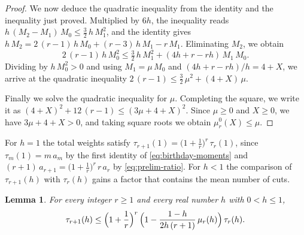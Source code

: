 \documentclass{amsart}
\newtheorem{lemma}[theorem]{Lemma}
\theoremstyle{definition}
\theoremstyle{remark}
\numberwithin{equation}{section}
\begin{document}
\begin{proof}
We now deduce the quadratic inequality from the identity and the inequality just proved. Multiplied by $6h$, the inequality reads $h\,(M_2-M_1)\,M_0\le\frac32\,h\,M_1^2$, and the identity gives $h\,M_2=2\,(r-1)\,h\,M_0+(r-3)\,h\,M_1-r\,M_1$. Eliminating $M_2$, we obtain
\[
2\,(r-1)\,h\,M_0^2\le\tfrac32\,h\,M_1^2+(4h+r-rh)\,M_1\,M_0.
\]
Dividing by $h\,M_0^2>0$ and using $M_1=\mu\,M_0$ and $(4h+r-rh)/h=4+X$, we arrive at the quadratic inequality $2\,(r-1)\le\frac32\,\mu^2+(4+X)\,\mu$.

Finally we solve the quadratic inequality for $\mu$. Completing the square, we write it as $(4+X)^2+12\,(r-1)\le(3\mu+4+X)^2$. Since $\mu\ge 0$ and $X\ge 0$, we have $3\mu+4+X>0$, and taking square roots we obtain $\mu^0_r(X)\le\mu$.
\end{proof}

For $h=1$ the total weights satisfy $\tau_{r+1}(1)=\bigl(1+\frac1r\bigr)^{r}\,\tau_r(1)$, since $\tau_m(1)=m\,a_m$ by the first identity of \eqref{eq:birthday-moments} and $(r+1)\,a_{r+1}=\bigl(1+\frac1r\bigr)^{r}\,r\,a_r$ by \eqref{eq:prelim-ratio}. For $h<1$ the comparison of $\tau_{r+1}(h)$ with $\tau_r(h)$ gains a factor that contains the mean number of cuts.

\begin{lemma}\label{lem:homogeneous}
For every integer $r\ge 1$ and every real number $h$ with $0<h\le 1$,
\[
\tau_{r+1}(h)\le\Bigl(1+\frac1r\Bigr)^{r}\,\Bigl(1-\frac{1-h}{2h\,(r+1)}\,\mu_r(h)\Bigr)\,\tau_r(h).
\]
\end{lemma}
\end{document}

